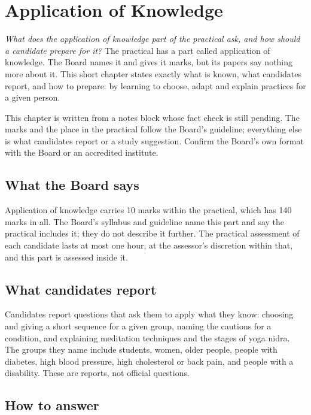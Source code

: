 \chapter{Application of Knowledge}
\label{ch:application}

\emph{What does the application of knowledge part of the practical ask, and how should a candidate prepare for it?}
The practical has a part called application of knowledge. The Board names it and gives it marks, but its papers say nothing more about it. This short chapter states exactly what is known, what candidates report, and how to prepare: by learning to choose, adapt and explain practices for a given person.

\begin{unverified}
This chapter is written from a notes block whose fact check is still pending. The marks and the place in the practical follow the Board's guideline; everything else is what candidates report or a study suggestion. Confirm the Board's own format with the Board or an accredited institute.
\end{unverified}

\section{What the Board says}

Application of knowledge carries 10 marks within the practical, which has 140 marks in all. The Board's syllabus and guideline name this part and say the practical includes it; they do not describe it further. The practical assessment of each candidate lasts at most one hour, at the assessor's discretion within that, and this part is assessed inside it.

\section{What candidates report}

Candidates report questions that ask them to apply what they know: choosing and giving a short sequence for a given group, naming the cautions for a condition, and explaining meditation techniques and the stages of yoga nidra. The groups they name include students, women, older people, people with diabetes, high blood pressure, high cholesterol or back pain, and people with a disability. These are reports, not official questions.

\section{How to answer}

